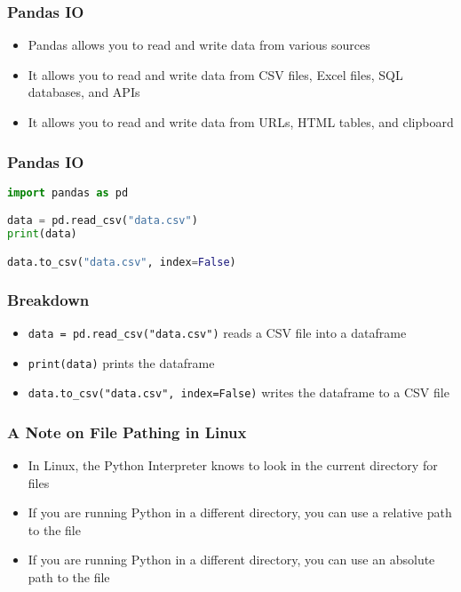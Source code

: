 \documentclass[serif, 9pt, aspectratio=32]{beamer}
\begin{document}
\begin{frame}
    \centering
    \frametitle{Pandas IO}
    \begin{itemize}
        \setlength{\itemsep}{2em}
        \item Pandas allows you to read and write data from various sources
        \item It allows you to read and write data from CSV files, Excel files, SQL databases, and APIs
        \item It allows you to read and write data from URLs, HTML tables, and clipboard
    \end{itemize}
\end{frame}

\begin{frame}[fragile]
    \frametitle{Pandas IO}
    \begin{lstlisting}[language=Python]
import pandas as pd

data = pd.read_csv("data.csv")
print(data)

data.to_csv("data.csv", index=False)
    \end{lstlisting}
\end{frame}

\begin{frame}
    \centering
    \frametitle{Breakdown}
    \begin{itemize}
        \setlength{\itemsep}{2em}
        \item \texttt{data = pd.read\_csv("data.csv")} reads a CSV file into a dataframe
        \item \texttt{print(data)} prints the dataframe
        \item \texttt{data.to\_csv("data.csv", index=False)} writes the dataframe to a CSV file
    \end{itemize}
\end{frame}

\begin{frame}
    \centering
    \frametitle{A Note on File Pathing in Linux}
    \begin{itemize}
        \setlength{\itemsep}{2em}
        \item In Linux, the Python Interpreter knows to look in the current directory for files
        \item If you are running Python in a different directory, you can use a relative path to the file
        \item If you are running Python in a different directory, you can use an absolute path to the file
    \end{itemize}
\end{frame}
\end{document}
